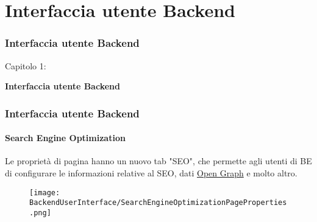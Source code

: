 %

\section{Interfaccia utente Backend}
\begin{frame}[fragile]
	\frametitle{Interfaccia utente Backend}

	\begin{center}\huge{Capitolo 1:}\end{center}
	\begin{center}\huge{\color{typo3darkgrey}\textbf{Interfaccia utente Backend}}\end{center}

\end{frame}


\begin{frame}[fragile]
	\frametitle{Interfaccia utente Backend}
	\framesubtitle{Search Engine Optimization}

	Le proprietà di pagina hanno un nuovo tab "SEO", che permette agli utenti di BE di configurare
	le informazioni relative al SEO, dati \href{http://ogp.me/}{Open Graph} e molto altro.

	\begin{figure}
		\texttt{[image: BackendUserInterface/SearchEngineOptimizationPageProperties.png]}
	\end{figure}

\end{frame}


